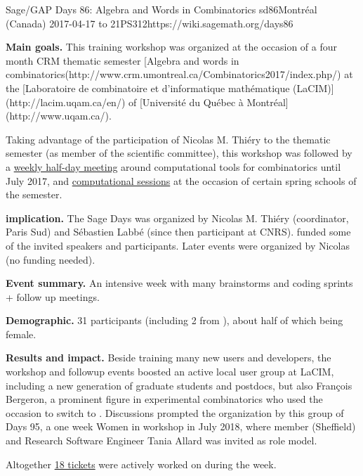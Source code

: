 \begin{event}{Sage/GAP Days 86: Algebra and Words in Combinatorics }{sd86}{Montréal (Canada) 2017-04-17 to 21}{PS}{31}{2}{https://wiki.sagemath.org/days86}

  \textbf{Main goals.} This training workshop was organized at the
  occasion of a four month CRM thematic semester
  [Algebra and words in combinatorics(http://www.crm.umontreal.ca/Combinatorics2017/index.php/)
  at the [Laboratoire de combinatoire et d'informatique mathématique (LaCIM)](http://lacim.uqam.ca/en/) of
  [Université du Québec à Montréal](http://www.uqam.ca/).

  Taking advantage of the participation of Nicolas M. Thiéry to the
  thematic semester (as member of the scientific committee), this
  workshop was followed by a
  \href{https://wiki.sagemath.org/Montreal}{weekly half-day meeting}
  around computational tools for combinatorics until July 2017, and
  \href{https://more-sagemath-tutorials.readthedocs.io/en/latest/2017-05-29-CRM/}{computational
    sessions} at the occasion of certain spring schools of the
  semester.

  \textbf{\ODK implication.} The Sage Days was organized by Nicolas M.
  Thiéry (\ODK coordinator, Paris Sud) and Sébastien Labbé (since then
  \ODK participant at CNRS). \ODK funded some of the invited speakers
  and \ODK participants. Later events were organized by Nicolas (no
  funding needed).

  \textbf{Event summary.} An intensive week with many brainstorms and
  coding sprints + follow up meetings.

  \textbf{Demographic.} 31 participants (including 2 from \ODK), about
  half of which being female.

  \textbf{Results and impact.} Beside training many new \Sage users
  and developers, the workshop and followup events boosted an active
  local user group at LaCIM, including a new generation of graduate
  students and postdocs, but also François Bergeron, a prominent
  figure in experimental combinatorics who used the occasion to switch
  to \Sage. Discussions prompted the organization by this group of
  \Sage Days 95, a one week Women in \Sage workshop in July 2018,
  where \ODK member (Sheffield) and Research Software Engineer Tania
  Allard was invited as role model.

  Altogether
  \href{https://trac.sagemath.org/query?status=closed&status=needs_info&status=needs_review&status=needs_work&status=new&status=positive_review&keywords=~days86&col=id&col=summary&col=status&col=time&col=changetime&col=author&col=reviewer&order=status}{18
    \Sage tickets} were actively worked on during the week.
\end{event}
